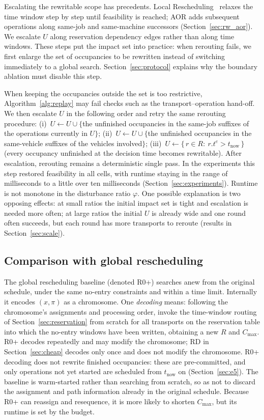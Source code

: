 Escalating the rewritable scope has precedents. Local Rescheduling~\cite{kuster2007local}
relaxes the time window step by step until feasibility is reached; AOR adds subsequent operations along same-job and same-machine successors
(Section~\ref{sec:rw_aor}). We escalate \(U\) along reservation dependency edges rather than along time windows.
These steps put the impact set into practice: when rerouting fails, we first enlarge the set of occupancies to be rewritten instead of switching immediately to a global search.
Section~\ref{sec:protocol} explains why the boundary ablation must disable this step.

When keeping the occupancies outside the set is too restrictive, Algorithm~\ref{alg:replay} may fail checks such as the transport--operation hand-off.
We then escalate \(U\) in the following order and retry the same rerouting procedure:
(i)~\(U\leftarrow U\cup\{\)the unfinished occupancies in the same-job suffixes of the operations currently in \(U\}\);
(ii)~\(U\leftarrow U\cup\{\)the unfinished occupancies in the same-vehicle suffixes of the vehicles involved\(\}\);
(iii)~\(U\leftarrow\{\,r\in R:\ r.t^e>t_{\mathrm{now}}\,\}\) (every occupancy unfinished at the decision time becomes rewritable).
After escalation, rerouting remains a deterministic single pass. In the experiments this step restored feasibility in all cells, with runtime staying in the range of milliseconds to
a little over ten milliseconds (Section~\ref{sec:experiments}). Runtime is not monotone in the disturbance ratio \(\varphi\).
One possible explanation is two opposing effects: at small ratios the initial impact set is tight and escalation is needed more often; at large ratios the initial \(U\) is already wide
and one round often succeeds, but each round has more transports to reroute (results in Section~\ref{sec:scale}).

\subsection{Comparison with global rescheduling}
\label{sec:vs_r0}

The global rescheduling baseline (denoted R0+) searches anew from the original schedule, under the same no-entry constraints and within a time limit.
Internally it encodes \((x,\pi)\) as a chromosome. One \emph{decoding} means: following the chromosome's assignments and processing order,
invoke the time-window routing of Section~\ref{sec:reservation} from scratch for all transports on the reservation table into which the no-entry windows have been written,
obtaining a new \(R\) and \(C_{\max}\). R0+ decodes repeatedly and may modify the chromosome; RD in Section~\ref{sec:cheap}
decodes only once and does not modify the chromosome. R0+ decoding does not rewrite finished occupancies: these are pre-committed,
and only operations not yet started are scheduled from \(t_{\mathrm{now}}\) on (Section~\ref{sec:e5}).
The baseline is warm-started rather than searching from scratch, so as not to discard the assignment and path information already in the original schedule.
Because R0+ can reassign and resequence, it is more likely to shorten \(C_{\max}\), but its runtime is set by the budget.

